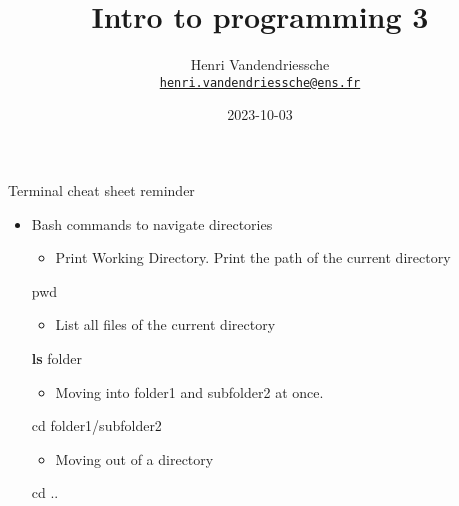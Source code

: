\documentclass[
  8pt,
  ignorenonframetext,
]{beamer}
\title{Intro to programming 3}
\author{Henri Vandendriessche\\
\href{mailto:henri.vandendriessche@ens.fr}{\nolinkurl{henri.vandendriessche@ens.fr}}}
\date{2023-10-03}
\newenvironment{Shaded}{\begin{snugshade}}{\end{snugshade}}
\newcommand{\BuiltInTok}[1]{#1}
\newcommand{\FunctionTok}[1]{\textcolor[rgb]{0.13,0.29,0.53}{\textbf{#1}}}
\newcommand{\NormalTok}[1]{#1}
\providecommand{\tightlist}{%
  \setlength{\itemsep}{0pt}\setlength{\parskip}{0pt}}
\begin{document}
\frame{\titlepage}

\begin{frame}[fragile]{Terminal cheat sheet reminder}
\protect\hypertarget{terminal-cheat-sheet-reminder}{}
\begin{itemize}
\item
  Bash commands to navigate directories

  \begin{itemize}
  \tightlist
  \item
    Print Working Directory. Print the path of the current directory
  \end{itemize}

\begin{Shaded}
\begin{Highlighting}[]
\BuiltInTok{pwd}
\end{Highlighting}
\end{Shaded}

  \begin{itemize}
  \tightlist
  \item
    List all files of the current directory
  \end{itemize}

\begin{Shaded}
\begin{Highlighting}[]
\FunctionTok{ls}\NormalTok{ folder}
\end{Highlighting}
\end{Shaded}

  \begin{itemize}
  \tightlist
  \item
    Moving into folder1 and subfolder2 at once.
  \end{itemize}

\begin{Shaded}
\begin{Highlighting}[]
\BuiltInTok{cd}\NormalTok{ folder1/subfolder2}
\end{Highlighting}
\end{Shaded}

  \begin{itemize}
  \tightlist
  \item
    Moving out of a directory
  \end{itemize}

\begin{Shaded}
\begin{Highlighting}[]
\BuiltInTok{cd}\NormalTok{ ..}
\end{Highlighting}
\end{Shaded}


\end{itemize}
\end{frame}
\end{document}
